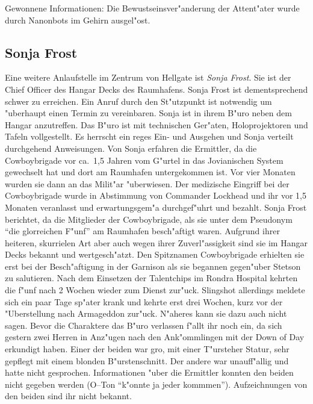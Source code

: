 \begin{remarks}
	Gewonnene Informationen: Die Bewustseinsver"anderung der Attent"ater wurde durch Nanonbots im Gehirn ausgel"ost.
\end{remarks}


\subsection{Sonja Frost}

Eine weitere Anlaufstelle im Zentrum von Hellgate ist \emph{Sonja Frost}. Sie ist der Chief Officer des Hangar Decks des Raumhafens. Sonja Frost ist dementsprechend schwer zu erreichen. Ein Anruf durch den St"utzpunkt ist notwendig um "uberhaupt einen Termin zu vereinbaren. Sonja ist in ihrem B"uro neben dem Hangar anzutreffen. Das B"uro ist mit technischen Ger"aten, Holoprojektoren und Tafeln vollgestellt. Es herrscht ein reges Ein- und Ausgehen und Sonja verteilt durchgehend Anweisungen. Von Sonja erfahren die Ermittler, da\3 die Cowboybrigade vor ca.~1,5 Jahren vom G"urtel in das Jovianischen System gewechselt hat und dort am Raumhafen untergekommen ist. Vor vier Monaten wurden sie dann an das Milit"ar "uberwiesen. Der medizische Eingriff bei der Cowboybrigade wurde in Abstimmung von Commander Lockhead und ihr vor 1,5 Monaten veranlasst und erwartungsgem"a\3 durchgef"uhrt und bezahlt. Sonja Frost berichtet, da\3 die Mitglieder der Cowboybrigade, als sie unter dem Pseudonym "`die glorreichen F"unf"' am Raumhafen besch"aftigt waren. Aufgrund ihrer heiteren, skurrielen Art aber auch wegen ihrer Zuverl"assigkeit sind sie im Hangar Decks bekannt und wertgesch"atzt.  Den Spitznamen Cowboybrigade erhielten sie erst bei der Besch"aftigung in der Garnison als sie begannen gegen"uber Stetson zu salutieren. Nach dem Einsetzen der Talentchips im Rondra Hospital kehrten die f"unf nach 2 Wochen wieder zum Dienst zur"uck. Slingshot allerdings meldete sich ein paar Tage sp"ater krank und kehrte erst drei Wochen, kurz vor der "Uberstellung nach Armageddon zur"uck. N"aheres kann sie dazu auch nicht sagen. Bevor die Charaktere das B"uro verlassen f"allt ihr noch ein, da\3 sich gestern zwei Herren in Anz"ugen nach den Ank"ommlingen mit der Down of Day erkundigt haben. Einer der beiden war gro\3, mit einer T"ursteher Statur, sehr gepflegt mit einem blonden B"urstenschnitt. Der andere war unauff"allig und hatte nicht gesprochen. Informationen "uber die Ermittler konnten den beiden nicht gegeben werden (O--Ton "`k"onnte ja jeder kommmen"'). Aufzeichnungen von den beiden sind ihr nicht bekannt.


